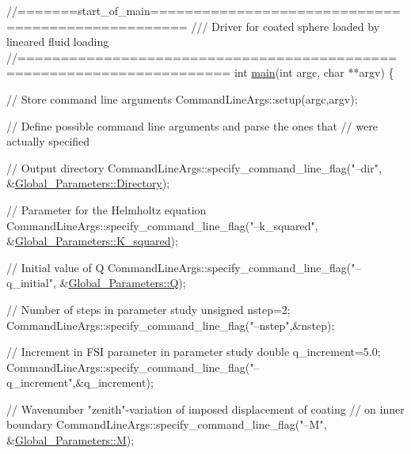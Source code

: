  
\begin{DoxyCodeInclude}
\textcolor{comment}{//=======start\_of\_main==================================================}
\textcolor{comment}{/// Driver for coated sphere loaded by lineared fluid loading}
\textcolor{comment}{}\textcolor{comment}{//======================================================================}
\textcolor{keywordtype}{int} \hyperlink{fourier__decomposed__acoustic__fsi_8cc_a3c04138a5bfe5d72780bb7e82a18e627}{main}(\textcolor{keywordtype}{int} argc, \textcolor{keywordtype}{char} **argv)
\{

 \textcolor{comment}{// Store command line arguments}
 CommandLineArgs::setup(argc,argv);

 \textcolor{comment}{// Define possible command line arguments and parse the ones that}
 \textcolor{comment}{// were actually specified}
 
 \textcolor{comment}{// Output directory}
 CommandLineArgs::specify\_command\_line\_flag(\textcolor{stringliteral}{"--dir"},
                                            &\hyperlink{namespaceGlobal__Parameters_a301ab922df72030c660b21328d6caf76}{Global\_Parameters::Directory});

 \textcolor{comment}{// Parameter for the Helmholtz equation}
 CommandLineArgs::specify\_command\_line\_flag(\textcolor{stringliteral}{"--k\_squared"},
                                            &\hyperlink{namespaceGlobal__Parameters_a91a3fa265abaf9e724c668ee800ffb29}{Global\_Parameters::K\_squared});
 
 \textcolor{comment}{// Initial value of Q }
 CommandLineArgs::specify\_command\_line\_flag(\textcolor{stringliteral}{"--q\_initial"}, 
                                            &\hyperlink{namespaceGlobal__Parameters_a7814fddf663e56168174a42d2cd6b4c1}{Global\_Parameters::Q});
 
 \textcolor{comment}{// Number of steps in parameter study}
 \textcolor{keywordtype}{unsigned} nstep=2;
 CommandLineArgs::specify\_command\_line\_flag(\textcolor{stringliteral}{"--nstep"},&nstep);
 
 \textcolor{comment}{// Increment in FSI parameter in parameter study}
 \textcolor{keywordtype}{double} q\_increment=5.0;
 CommandLineArgs::specify\_command\_line\_flag(\textcolor{stringliteral}{"--q\_increment"},&q\_increment);
 
 
 \textcolor{comment}{// Wavenumber "zenith"-variation of imposed displacement of coating}
 \textcolor{comment}{// on inner boundary }
 CommandLineArgs::specify\_command\_line\_flag(\textcolor{stringliteral}{"--M"},
                                            &\hyperlink{namespaceGlobal__Parameters_abc67bb72ab99af013e3c7f6ffe453798}{Global\_Parameters::M});
 

\end{DoxyCodeInclude}
